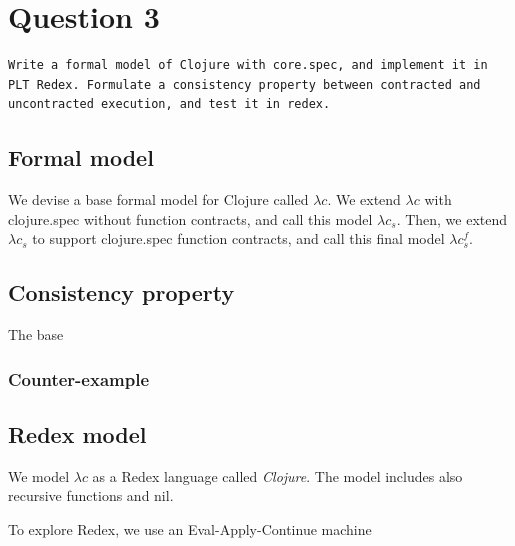 \section{Question 3}

\begin{verbatim}
Write a formal model of Clojure with core.spec, and implement it in
PLT Redex. Formulate a consistency property between contracted and
uncontracted execution, and test it in redex.
\end{verbatim}

\subsection{Formal model}

%

We devise a base formal model for Clojure called $\lambda c$.
We extend $\lambda c$ with clojure.spec without function contracts, and call
this model $\lambda c_s$. 
Then, we extend $\lambda c_s$ to support
clojure.spec function contracts, and call this final model $\lambda c_{s}^{f}$.



\subsection{Consistency property}

The base 

\subsubsection{Counter-example}

\subsection{Redex model}

We model $\lambda c$ as a Redex language called \emph{Clojure}.
The model includes also recursive functions and nil.

To explore Redex, we use an Eval-Apply-Continue machine

